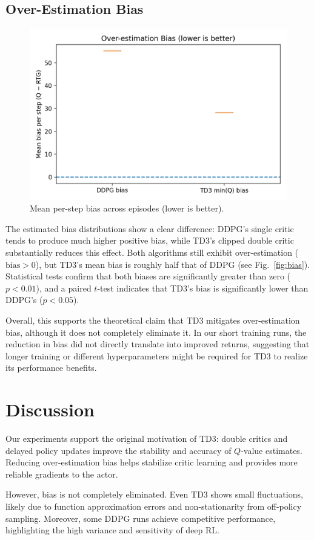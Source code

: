 \documentclass[10pt,letterpaper]{article}
\begin{document}
\subsection{Over-Estimation Bias}
\begin{figure}[h]
  \centering
  \includegraphics[width=.7\linewidth]{fig_bias_box.png}
  \caption{Mean per-step bias across episodes (lower is better).}
\end{figure}

The estimated bias distributions show a clear difference: DDPG’s single critic tends to produce much higher positive bias, while TD3’s clipped double critic substantially reduces this effect. Both algorithms still exhibit over-estimation ($\text{bias} > 0$), but TD3’s mean bias is roughly half that of DDPG (see Fig.~\ref{fig:bias}). Statistical tests confirm that both biases are significantly greater than zero ($p < 0.01$), and a paired $t$-test indicates that TD3’s bias is significantly lower than DDPG’s ($p < 0.05$).  

Overall, this supports the theoretical claim that TD3 mitigates over-estimation bias, although it does not completely eliminate it. In our short training runs, the reduction in bias did not directly translate into improved returns, suggesting that longer training or different hyperparameters might be required for TD3 to realize its performance benefits.


\section{Discussion}
Our experiments support the original motivation of TD3: double critics and delayed policy updates improve the stability and accuracy of $Q$-value estimates. Reducing over-estimation bias helps stabilize critic learning and provides more reliable gradients to the actor.

However, bias is not completely eliminated. Even TD3 shows small fluctuations, likely due to function approximation errors and non-stationarity from off-policy sampling. Moreover, some DDPG runs achieve competitive performance, highlighting the high variance and sensitivity of deep RL.
\end{document}
